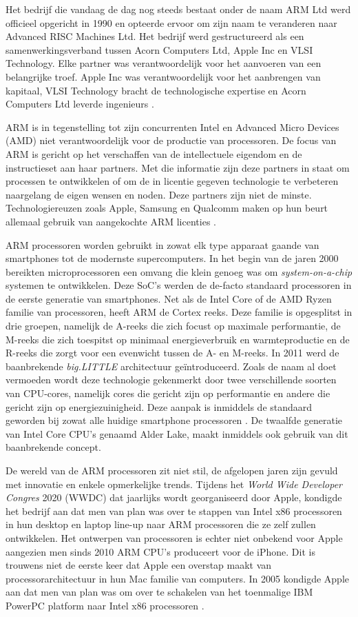 Het bedrijf die vandaag de dag nog steeds bestaat onder de naam ARM Ltd werd officieel opgericht in 1990 en opteerde ervoor om zijn naam te veranderen naar Advanced RISC Machines Ltd. Het bedrijf werd gestructureerd als een samenwerkingsverband tussen Acorn Computers Ltd, Apple Inc en VLSI Technology. Elke partner was verantwoordelijk voor het aanvoeren van een belangrijke troef. Apple Inc was verantwoordelijk voor het aanbrengen van kapitaal, VLSI Technology bracht de technologische expertise en Acorn Computers Ltd leverde ingenieurs \autocite{Walshe2015}.

ARM is in tegenstelling tot zijn concurrenten Intel en Advanced Micro Devices (AMD) niet verantwoordelijk voor de productie van processoren. De focus van ARM is gericht op het verschaffen van de intellectuele eigendom en de instructieset aan haar partners. Met die informatie zijn deze partners in staat om processen te ontwikkelen of om de in licentie gegeven technologie te verbeteren naargelang de eigen wensen en noden. Deze partners zijn niet de minste. Technologiereuzen zoals Apple, Samsung en Qualcomm maken op hun beurt allemaal gebruik van aangekochte ARM licenties \autocite{Ahammed2017}.

ARM processoren worden gebruikt in zowat elk type apparaat gaande van smartphones tot de modernste supercomputers. In het begin van de jaren 2000 bereikten microprocessoren een omvang die klein genoeg was om \textit{system-on-a-chip} systemen te ontwikkelen. Deze SoC’s werden de de-facto standaard processoren in de eerste generatie van smartphones. Net als de Intel Core of de AMD Ryzen familie van processoren, heeft ARM de Cortex reeks. Deze familie is opgesplitst in drie groepen, namelijk de A-reeks die zich focust op maximale performantie, de M-reeks die zich toespitst op minimaal energieverbruik en warmteproductie en de R-reeks die zorgt voor een evenwicht tussen de A- en M-reeks. In 2011 werd de baanbrekende \textit{big.LITTLE} architectuur geïntroduceerd. Zoals de naam al doet vermoeden wordt deze technologie gekenmerkt door twee verschillende soorten van CPU-cores, namelijk cores die gericht zijn op performantie en andere die gericht zijn op energiezuinigheid. Deze aanpak is inmiddels de standaard geworden bij zowat alle huidige smartphone processoren \autocite{Walshe2015a}. De twaalfde generatie van Intel Core CPU’s genaamd Alder Lake, maakt inmiddels ook gebruik van dit baanbrekende concept.

De wereld van de ARM processoren zit niet stil, de afgelopen jaren zijn gevuld met innovatie en enkele opmerkelijke trends. Tijdens het \textit{World Wide Developer Congres} 2020 (WWDC) dat jaarlijks wordt georganiseerd door Apple, kondigde het bedrijf aan dat men van plan was over te stappen van Intel x86 processoren in hun desktop en laptop line-up naar ARM processoren die ze zelf zullen ontwikkelen. Het ontwerpen van processoren is echter niet onbekend voor Apple aangezien men sinds 2010 ARM CPU’s produceert voor de iPhone. Dit is trouwens niet de eerste keer dat Apple een overstap maakt van processorarchitectuur in hun Mac familie van computers. In 2005 kondigde Apple aan dat men van plan was om over te schakelen van het toenmalige IBM PowerPC platform naar Intel x86 processoren \autocite{Fulton2020}. 

